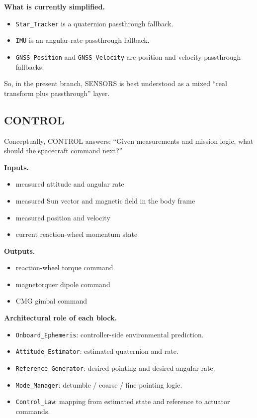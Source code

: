 \documentclass[11pt]{article}
\begin{document}
\textbf{What is currently simplified.}

\begin{itemize}
\item \texttt{Star\_Tracker} is a quaternion passthrough fallback.
\item \texttt{IMU} is an angular-rate passthrough fallback.
\item \texttt{GNSS\_Position} and \texttt{GNSS\_Velocity} are position and velocity passthrough fallbacks.
\end{itemize}

So, in the present branch, SENSORS is best understood as a mixed ``real transform plus passthrough'' layer.

\subsection{CONTROL}

Conceptually, CONTROL answers: ``Given measurements and mission logic, what should the spacecraft command next?''

\textbf{Inputs.}

\begin{itemize}
\item measured attitude and angular rate
\item measured Sun vector and magnetic field in the body frame
\item measured position and velocity
\item current reaction-wheel momentum state
\end{itemize}

\textbf{Outputs.}

\begin{itemize}
\item reaction-wheel torque command
\item magnetorquer dipole command
\item CMG gimbal command
\end{itemize}

\textbf{Architectural role of each block.}

\begin{itemize}
\item \texttt{Onboard\_Ephemeris}: controller-side environmental prediction.
\item \texttt{Attitude\_Estimator}: estimated quaternion and rate.
\item \texttt{Reference\_Generator}: desired pointing and desired angular rate.
\item \texttt{Mode\_Manager}: detumble / coarse / fine pointing logic.
\item \texttt{Control\_Law}: mapping from estimated state and reference to actuator commands.
\end{itemize}
\end{document}
